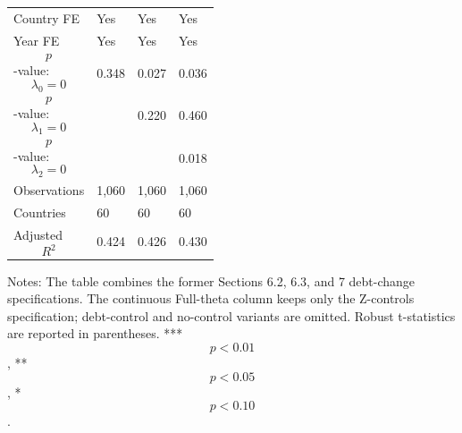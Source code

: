 \begin{table}[H]
\begin{threeparttable}
\begin{tabularx}{\textwidth}{lYYY}
Country FE & Yes & Yes & Yes \\
Year FE & Yes & Yes & Yes \\
$$p$$-value: $$\lambda_0=0$$ & 0.348 & 0.027 & 0.036 \\
$$p$$-value: $$\lambda_1=0$$ &  & 0.220 & 0.460 \\
$$p$$-value: $$\lambda_2=0$$ &  &  & 0.018 \\
Observations & 1,060 & 1,060 & 1,060 \\
Countries & 60 & 60 & 60 \\
Adjusted $$R^2$$ & 0.424 & 0.426 & 0.430 \\
\bottomrule
\end{tabularx}
\begin{tablenotes}[flushleft]\footnotesize
\item Notes: The table combines the former Sections 6.2, 6.3, and 7 debt-change specifications. The continuous Full-theta column keeps only the Z-controls specification; debt-control and no-control variants are omitted. Robust t-statistics are reported in parentheses. *** $$p<0.01$$, ** $$p<0.05$$, * $$p<0.10$$.
\end{tablenotes}
\end{threeparttable}
\end{table}

